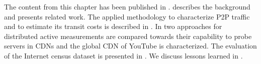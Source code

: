 
The content from this chapter has been published in \cite{burger2012profit,burger2014vantage,burger2016hierarchical}.
 describes the background and presents related work.
The applied methodology to characterize P2P traffic and to estimate its transit costs is described in .
In  two approaches for distributed active measurements are compared towards their capability to probe servers in CDNs and the global CDN of YouTube is characterized.
The evaluation of the Internet census dataset is presented in .
We discuss lessons learned in .






